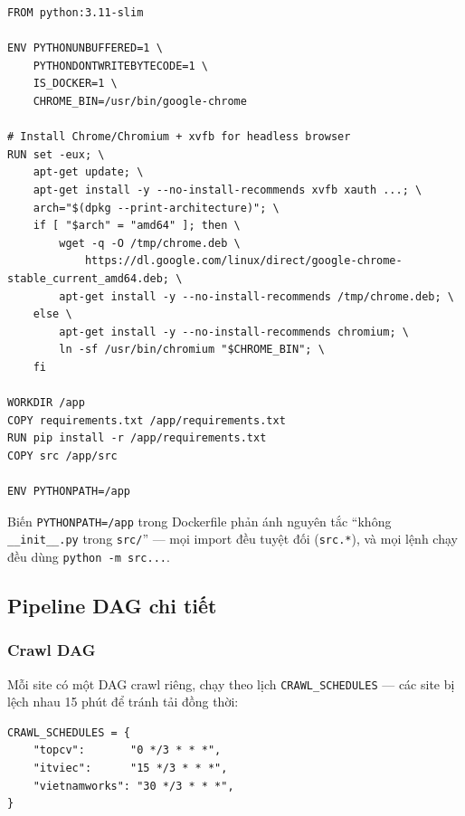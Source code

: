 \begin{lstlisting}[style=bashstyle, caption={Dockerfile — image lakehouse-crawler cho pipeline tasks}]
FROM python:3.11-slim

ENV PYTHONUNBUFFERED=1 \
    PYTHONDONTWRITEBYTECODE=1 \
    IS_DOCKER=1 \
    CHROME_BIN=/usr/bin/google-chrome

# Install Chrome/Chromium + xvfb for headless browser
RUN set -eux; \
    apt-get update; \
    apt-get install -y --no-install-recommends xvfb xauth ...; \
    arch="$(dpkg --print-architecture)"; \
    if [ "$arch" = "amd64" ]; then \
        wget -q -O /tmp/chrome.deb \
            https://dl.google.com/linux/direct/google-chrome-stable_current_amd64.deb; \
        apt-get install -y --no-install-recommends /tmp/chrome.deb; \
    else \
        apt-get install -y --no-install-recommends chromium; \
        ln -sf /usr/bin/chromium "$CHROME_BIN"; \
    fi

WORKDIR /app
COPY requirements.txt /app/requirements.txt
RUN pip install -r /app/requirements.txt
COPY src /app/src

ENV PYTHONPATH=/app
\end{lstlisting}

Biến \texttt{PYTHONPATH=/app} trong Dockerfile phản ánh nguyên tắc ``không
\texttt{\_\_init\_\_.py} trong \texttt{src/}'' --- mọi import đều tuyệt đối
(\texttt{src.*}), và mọi lệnh chạy đều dùng \texttt{python -m src...}.

\subsection{Pipeline DAG chi tiết}
\label{subsec:dag-details}

\subsubsection{Crawl DAG}

Mỗi site có một DAG crawl riêng, chạy theo lịch \texttt{CRAWL\_SCHEDULES} ---
các site bị lệch nhau 15 phút để tránh tải đồng thời:

\begin{lstlisting}[style=pystyle, caption={Lịch crawl — lệch 15 phút giữa các site}]
CRAWL_SCHEDULES = {
    "topcv":       "0 */3 * * *",
    "itviec":      "15 */3 * * *",
    "vietnamworks": "30 */3 * * *",
}
\end{lstlisting}

